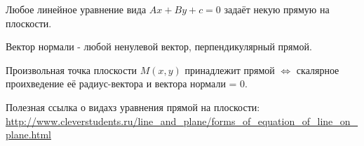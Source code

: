 \documentclass[12pt, a4paper]{article}
\begin{document}
    \begin{theorem}
        Любое линейное уравнение вида $Ax + By + c = 0$ задаёт некую прямую на плоскости. 
    \end{theorem}


    \begin{definition}
        Вектор нормали - любой ненулевой вектор, перпендикулярный прямой.
    \end{definition}

    Произвольная точка плоскости $M(x, y)$ принадлежит прямой $\Longleftrightarrow$ скалярное проихведение её радиус-вектора и вектора нормали = 0. 


    Полезная ссылка о видахз уравнения прямой на плоскости: \url{http://www.cleverstudents.ru/line_and_plane/forms_of_equation_of_line_on_plane.html}
\end{document}
